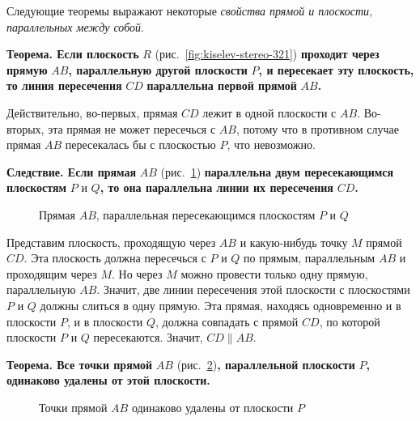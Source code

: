 Следующие теоремы выражают некоторые \emph{свойства прямой и плоскости, параллельных между собой}.

 \textbf{Теорема. Если плоскость} \(R\) (рис.~\ref{fig:kiselev-stereo-321}) \textbf{проходит через прямую} \(AB\)\textbf{, параллельную другой плоскости} \(P\)\textbf{, и пересекает эту плоскость, то линия пересечения} \(CD\) \textbf{параллельна первой прямой} \(AB\)\textbf{.}

Действительно, во-первых, прямая \(CD\) лежит в одной плоскости с \(AB\). Во-вторых, эта прямая не может пересечься с \(AB\), потому что в противном случае прямая \(AB\) пересекалась бы с плоскостью \(P\), что невозможно.

 \textbf{Следствие. Если прямая} \(AB\) (рис.~\ref{fig:kiselev-stereo-322}) \textbf{параллельна двум пересекающимся плоскостям} \(P\) и \(Q\)\textbf{, то она параллельна линии их пересечения} \(CD\)\textbf{.}

\begin{figure}[htbp]
    \centering
    \renewcommand{\thefigure}{322}
    \captionsetup{name=Рис.,labelsep=period}
    
    \caption{Прямая \(AB\), параллельная пересекающимся плоскостям \(P\) и \(Q\)}\label{fig:kiselev-stereo-322}
\end{figure}

Представим плоскость, проходящую через \(AB\) и какую-нибудь точку \(M\) прямой \(CD\). Эта плоскость должна пересечься с \(P\) и \(Q\) по прямым, параллельным \(AB\) и проходящим через \(M\).
Но через \(M\) можно провести только одну прямую, параллельную \(AB\). Значит, две линии пересечения этой плоскости с плоскостями \(P\) и \(Q\) должны слиться в одну прямую. Эта прямая, находясь одновременно и в плоскости \(P\), и в плоскости \(Q\), должна совпадать с прямой \(CD\), по которой плоскости \(P\) и \(Q\) пересекаются. Значит, \(CD\parallel AB\).

 \textbf{Теорема. Все точки прямой} \(AB\) (рис.~\ref{fig:kiselev-stereo-323})\textbf{, параллельной плоскости} \(P\)\textbf{, одинаково удалены от этой плоскости.}

\begin{figure}[htbp]
    \centering
    \renewcommand{\thefigure}{323}
    \captionsetup{name=Рис.,labelsep=period}
    
    \caption{Точки прямой \(AB\) одинаково удалены от плоскости \(P\)}\label{fig:kiselev-stereo-323}
\end{figure}

